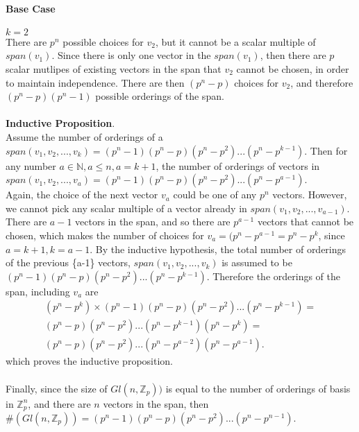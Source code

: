 \documentclass[12pt, letterpaper]{article}
\begin{document}
\paragraph{Base Case} \(k = 2\) \\
There are \(p^n\) possible choices for \(v_2\), but it cannot be a scalar multiple of  
\(span(v_1)\). Since there is only one vector in the \(span(v_1)\), then there are \(p\) scalar mutlipes of existing vectors in the span that \(v_2\) cannot be chosen, in order to maintain independence. There are then \((p^n - p)\) choices for \(v_2\), and therefore \((p^n - p)(p^n - 1)\) possible orderings of the span.
\\\\
\textbf{Inductive Proposition}.
\\
Assume the number of orderings of a \(span(v_1, v_2, . . . , v_k) = (p^n - 1)(p^n - p)(p^n - p^{2})...(p^n - p^{k-1})\). Then for any number \(a \in \mathbb{N}, a \leq n, a = k + 1\), the number of orderings of vectors in \(span(v_1, v_2, . . . , v_a) = (p^n - 1)(p^n - p)(p^n - p^{2})...(p^n - p^{a-1})\).
\\
Again, the choice of the next vector \(v_a\) could be one of any \(p^n\) vectors. However, we cannot pick any scalar multiple of a vector already in \(span(v_1, v_2, . . ., v_{a-1})\). There are \(a - 1\) vectors in the span, and so there are \(p^{a-1}\) vectors that cannot be chosen, which makes the number of choices for \(v_a = (p^n - p^{a-1}= p^n - p^k\), since \(a = k +1, k = a - 1\). By the inductive hypothesis, the total number of orderings of the previous \{a-1\} vectors, \(span(v_1,v_2, . . ., v_k)\) is assumed to be \((p^n - 1)(p^n - p)(p^n - p^{2})...(p^n - p^{k-1})\). Therefore the orderings of the span, including \(v_a\) are 
\begin{align*}
(p^{n} - p^k ) \times (p^n - 1)(p^n - p)(p^n - p^{2})...(p^n - p^{k-1}) =\\
 (p^n - p)(p^n - p^{2})...(p^n - p^{k-1})(p^n - p^k) =\\
  (p^n - p)(p^n - p^{2})...(p^n - p^{a-2})(p^n - p^{a-1}). \end{align*}
which proves the inductive proposition.
\\
\\
Finally, since the size of \(Gl(n, \mathbb{Z}_p))\) is equal to the number of orderings of basis in \(\mathbb{Z}_p^n\), and there are \(n\) vectors in the span, then \(\#(Gl(n, \mathbb{Z}_p)) = (p^n - 1)(p^n - p)(p^n - p^{2})...(p^n - p^{n-1})\).
\end{document}

